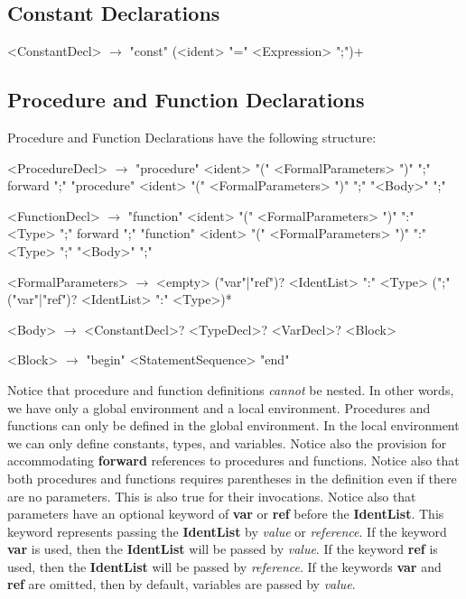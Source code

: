 \documentclass{book}
\begin{document}
\subsection{Constant Declarations}
\begin{grammar}
<ConstantDecl> $\rightarrow$ "const" (<ident> "=" <Expression> ";")+
\end{grammar}

\subsection{Procedure and Function Declarations}
Procedure and Function Declarations have the following structure:
\begin{grammar}
<ProcedureDecl>  $\rightarrow$ 
"procedure" <ident> "(" <FormalParameters> ")" ";" forward ";"
\alt "procedure" <ident> "(" <FormalParameters> ")" ";" "<Body>" ";"

<FunctionDecl>  $\rightarrow$ 
"function" <ident> "(" <FormalParameters> ")" ":" <Type> ";" forward ";"
\alt "function" <ident> "(" <FormalParameters> ")" ":" <Type>  ";" "<Body>" ";"

<FormalParameters> $\rightarrow$ <empty>
\alt ("var"|"ref")? <IdentList> ":" <Type> (";" ("var"|"ref")? <IdentList> ":" <Type>)*

<Body> $\rightarrow$ <ConstantDecl>? <TypeDecl>? <VarDecl>? <Block>

<Block> $\rightarrow$ "begin" <StatementSequence> "end"
\end{grammar}

Notice that procedure and function definitions \textit{cannot} be nested.
In other words, we have only a global environment and a local environment. 
Procedures and functions can only be defined in the global environment.
In the local environment we can only define constants, types, and variables.
Notice also the provision for accommodating \textbf{forward} references to procedures and functions.
Notice also that both procedures and functions requires parentheses
in the definition even if there are no parameters.
This is also true for their invocations.
Notice also that parameters have an optional keyword of \textbf{var} or \textbf{ref} before the \textbf{IdentList}.
This keyword represents passing the \textbf{IdentList} by \textit{value} or \textit{reference}.
If the keyword \textbf{var} is used, then the \textbf{IdentList} will be passed by \textit{value}.
If the keyword \textbf{ref} is used, then the \textbf{IdentList} will be passed by \textit{reference}.
If the keywords \textbf{var} and \textbf{ref} are omitted, then by default, variables are passed by \textit{value}.
\end{document}
